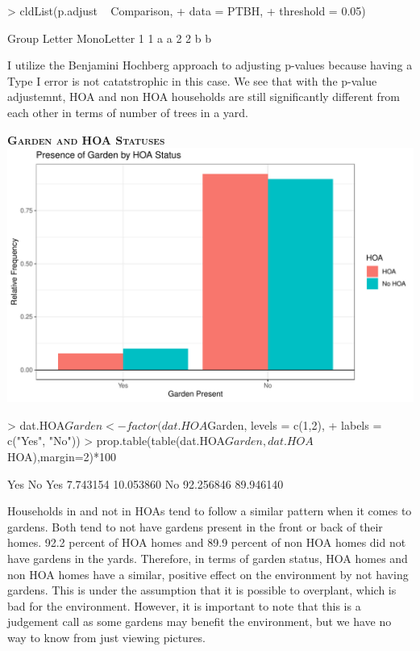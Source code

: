 \documentclass{article}
\begin{document}
\begin{Schunk}
\begin{Sinput}
> cldList(p.adjust ~ Comparison,
+         data = PTBH,
+         threshold = 0.05)
\end{Sinput}
\begin{Soutput}
  Group Letter MonoLetter
1     1      a         a 
2     2      b          b
\end{Soutput}
\end{Schunk}

I utilize the Benjamini Hochberg approach \citep{rcompanion} to adjusting p-values because having a Type I error is not catatstrophic in this case. We see that with the p-value adjustemnt, HOA and non HOA households are still significantly different from each other in terms of number of trees in a yard.

\newpage
\textsc{\textbf{Garden and HOA Statuses}}
\newline
\newline
\includegraphics{exam22-023}

\begin{Schunk}
\begin{Sinput}
> dat.HOA$Garden<-factor(dat.HOA$Garden, levels = c(1,2),
+                         labels = c("Yes", "No"))
> prop.table(table(dat.HOA$Garden, dat.HOA$HOA),margin=2)*100
\end{Sinput}
\begin{Soutput}
            Yes        No
  Yes  7.743154 10.053860
  No  92.256846 89.946140
\end{Soutput}
\end{Schunk}

Households in and not in HOAs tend to follow a similar pattern when it comes to gardens. Both tend to not have gardens present in the front or back of their homes. 92.2 percent of HOA homes and 89.9 percent of non HOA homes did not have gardens in the yards. Therefore, in terms of garden status, HOA homes and non HOA homes have a similar, positive effect on the environment by not having gardens. This is under the assumption that it is possible to overplant, which is bad for the environment. However, it is important to note that this is a judgement call as some gardens may benefit the environment, but we have no way to know from just viewing pictures.
\end{document}
